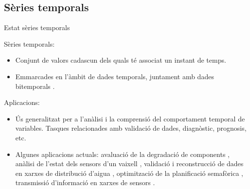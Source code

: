 \subsection{Sèries temporals}
\begin{frame}{Estat sèries temporals}

  Sèries temporals:

  \begin{itemize}

  \item Conjunt de valors cadascun dels quals té associat un instant
    de temps.

  \item Emmarcades en l'àmbit de dades temporals, juntament amb dades
    bitemporals \parencite{assfalg08:thesis}.

  \end{itemize}
  

  Aplicacions:
  \begin{itemize}

  \item Ús generalitzat per a l'anàlisi i la comprensió del
    comportament temporal de variables. Tasques relacionades amb
    validació de dades, diagnòstic, prognosis, etc.

  \item Algunes aplicacions actuals: avaluació de la degradació de
    components \parencite{yu11}, anàlisi de l'estat dels sensors d'un
    vaixell \parencite{palmer07}, validació i reconstrucció de dades
    en xarxes de distribució d'aigua \parencite{quevedo10},
    optimització de la planificació semafòrica \parencite{last11},
    transmissió d'informació en xarxes de
    sensors \parencite{jainagrawal05}.


  \end{itemize}

\end{frame}



